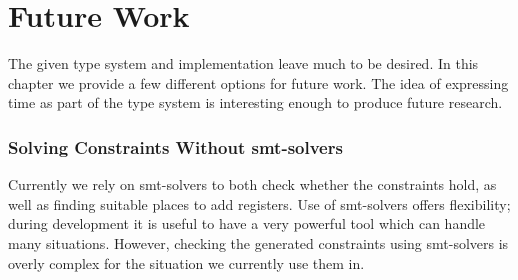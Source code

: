 \newcommand{\framedhslinecorrect}[2]%
  {#1[#2]}

\newcommand{\framedhs}{\sethscode{framedhscode}}


\newenvironment{inlinehscode}%
  {\(\def\column##1##2{}%
   \let\>\undefined\let\<\undefined\let\\\undefined
   \newcommand\>[1][]{}\newcommand\<[1][]{}\newcommand\\[1][]{}%
   \def\fromto##1##2##3{##3}%
   \def\nextline{}}{\) }%

\newcommand{\inlinehs}{\sethscode{inlinehscode}}


\newenvironment{joincode}%
  {\let\orighscode=\hscode
   \let\origendhscode=\endhscode
   \def\endhscode{\def\hscode{\endgroup\def\@currenvir{hscode}\\}\begingroup}
   \orighscode\def\hscode{\endgroup\def\@currenvir{hscode}}}%
  {\origendhscode
   \global\let\hscode=\orighscode
   \global\let\endhscode=\origendhscode}%

\makeatother
\EndFmtInput
%

\chapter{Future Work}
The given type system and implementation leave much to be desired.
In this chapter we provide a few different options for future work.
The idea of expressing time as part of the type system is interesting enough to produce future research.

\subsection{Solving Constraints Without \gls{smt}-solvers}
Currently we rely on \gls{smt}-solvers to both check whether the constraints hold, as well as finding suitable places to add registers.
Use of \gls{smt}-solvers offers flexibility; during development it is useful to have a very powerful tool which can handle many situations.
However, checking the generated constraints using \gls{smt}-solvers is overly complex for the situation we currently use them in.

